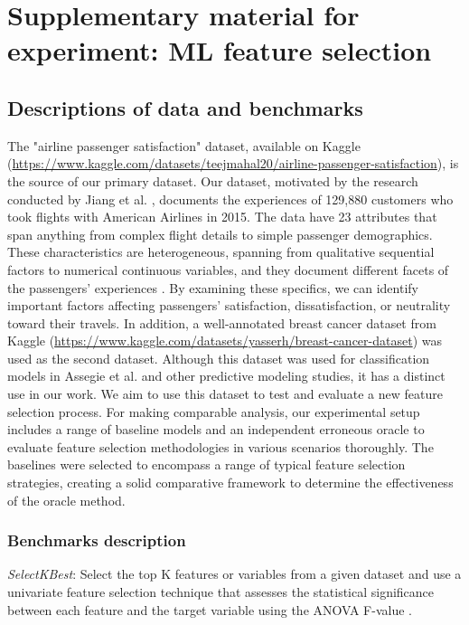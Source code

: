 \section{Supplementary material for experiment: ML feature selection} \label{appendix:supp-material-application1}

\subsection{Descriptions of data and benchmarks} \label{appendix:descriptions-data-benchmarks}

The "airline passenger satisfaction" dataset, available on Kaggle (\url{https://www.kaggle.com/datasets/teejmahal20/airline-passenger-satisfaction}), is the source of our primary dataset. Our dataset, motivated by the research conducted by Jiang et al. \cite{jiang2022forecast}, documents the experiences of 129,880 customers who took flights with American Airlines in 2015. The data have 23 attributes that span anything from complex flight details to simple passenger demographics. These characteristics are heterogeneous, spanning from qualitative sequential factors to numerical continuous variables, and they document different facets of the passengers' experiences \cite{jiang2022forecast}. By examining these specifics, we can identify important factors affecting passengers' satisfaction, dissatisfaction, or neutrality toward their travels. In addition, a well-annotated breast cancer dataset from Kaggle (\url{https://www.kaggle.com/datasets/yasserh/breast-cancer-dataset}) was used as the second dataset. Although this dataset was used for classification models in Assegie et al. \cite{assegie2021breast} and other predictive modeling studies, it has a distinct use in our work. We aim to use this dataset to test and evaluate a new feature selection process. For making comparable analysis, our experimental setup includes a range of baseline models and an independent erroneous oracle to evaluate feature selection methodologies in various scenarios thoroughly. The baselines were selected to encompass a range of typical feature selection strategies, creating a solid comparative framework to determine the effectiveness of the oracle method. 


\subsubsection*{Benchmarks description}

\textit{SelectKBest}: Select the top K features or variables from a given dataset and use a univariate feature selection technique that assesses the statistical significance between each feature and the target variable using the ANOVA F-value \cite{otchere2022application}. 

